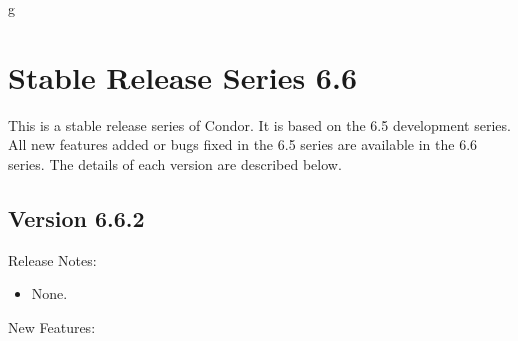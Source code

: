 g%
\section{\label{sec:History-6-6}Stable Release Series 6.6}

This is a stable release series of Condor.
It is based on the 6.5 development series.
All new features added or bugs fixed in the 6.5 series are available
in the 6.6 series.
The details of each version are described below.


\subsection{\label{sec:New-6-6-2}Version 6.6.2}

\noindent Release Notes:

\begin{itemize}

\item None.

\end{itemize}


\noindent New Features:

